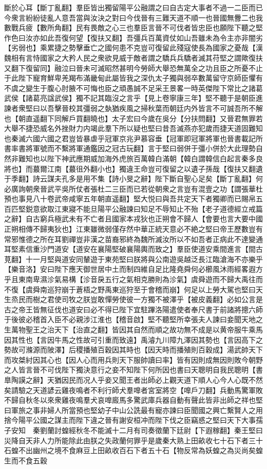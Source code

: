斷於心耳【斷丁亂翻】羣臣皆出獨留陽平公融謂之曰自古定大事者不過一二臣而已今衆言紛紛徒亂人意吾當與汝決之對曰今伐晉有三難天道不順一也晉國無釁二也我數戰兵疲【數所角翻】民有畏敵之心三也羣臣言晉不可伐者皆忠臣也願陛下聽之堅作色曰汝亦如此吾復何望【復扶又翻】吾彊兵百萬資仗如山吾雖未為令主亦非闇劣【劣弱也】乘累捷之勢擊垂亡之國何患不克豈可復留此殘寇使長為國家之憂哉【漢魏相有言恃國家之大矜人民之衆欲見威于敵者謂之驕兵兵驕者滅其苻堅之謂歟復扶又翻下復留同】融泣曰晉未可滅昭然甚明今勞師大舉恐無萬全之功且臣之所憂不止于此陛下寵育鮮卑羌羯布滿畿甸此屬皆我之深仇太子獨與弱卒數萬留守京師臣懼有不虞之變生于腹心肘腋不可悔也臣之頑愚誠不足采王景畧一時英傑陛下常比之諸葛武侯【諸葛亮諡武侯】獨不記其臨沒之言乎【見上卷寧康三年】堅不聽于是朝臣進諫者衆堅曰以吾擊晉校其彊弱之埶猶疾風之掃秋葉而朝廷内外皆言不可誠吾所不解也【朝直遥翻下同解戶買翻曉也】太子宏曰今歲在吳分【分扶問翻】又晉君無罪若大舉不捷恐威名外挫財力内竭此羣下所以疑也堅曰昔吾滅燕亦犯歲而捷天道固難知也秦滅六國六國之君豈皆暴虐乎冠軍京兆尹慕容垂【冠軍即冠軍將軍也晉書載記所書率書將軍號而不繫將軍通鑑因之冠古玩翻】言于堅曰弱併于彊小併於大此理勢自然非難知也以陛下神武應期威加海外虎旅百萬韓白滿朝【韓白謂韓信白起言秦多良將也】而蕞爾江南【蕞徂外翻小也】獨違王命豈可復留之以遺子孫哉【復扶又翻遺于季翻】詩云謀夫孔多是用不集【詩小旻之辭】陛下斷自聖心足矣【斷丁亂翻】何必廣詢朝衆晉武平吳所仗者張杜二三臣而已若從朝衆之言豈有混壹之功【謂張華杜預也事見八十卷武帝咸寧五年朝直遥翻】堅大悦曰與吾共定天下者獨卿而已賜帛五百匹堅鋭意欲取江東寢不能旦陽平公融諫曰知足不辱知止不殆【老子道德經立戒篇之辭】自古窮兵極武未有不亡者且國家本戎狄也正朔會不歸人【會要也言大要中國正朔相傳不歸夷狄也】江東雖微弱僅存然中華正統天意必不絶之堅曰帝王歷數豈有常邪惟德之所在耳劉禪豈非漢之苗裔邪終為魏所滅汝所以不如吾者正病此不達變通耳堅素信重沙門道安【道安在襄陽堅破襄陽輿而致之】羣臣使道安乘間進言【間古莧翻】十一月堅與道安同輦遊于東苑堅曰朕將與公南遊吳越泛長江臨滄海不亦樂乎【樂音洛】安曰陛下應天御世居中土而制四維自足比隆堯舜何必櫛風沐雨經畧遐方乎且東南卑濕沴氣易構【沴音戾五行之氣相克勝則為沴氣】虞舜遊而不歸大禹往而不復【虞舜南巡狩崩于蒼梧之野禹東巡狩至于會稽而崩】何足以上勞大駕也堅曰天生烝民而樹之君使司牧之朕豈敢憚勞使彼一方獨不被澤乎【被皮義翻】必如公言是古之帝王皆無征伐也道安曰必不得已陛下宜駐蹕洛陽遣使者奉尺書于前諸將摠六師于後彼必稽首入臣不必親涉江淮也【稽音啟】堅不聽堅所幸張夫人諫曰妾聞天地之生萬物聖王之治天下【治直之翻】皆因其自然而順之故功無不成是以黄帝服牛乘馬因其性也【言因牛馬之性故可引重而致遠】禹濬九川障九澤因其勢也【言因高下之勢故可滌源而陂澤】后稷播殖百穀因其時也【因天時而播殖則百穀成】湯武帥天下而攻桀紂因其心也【因人心而用兵則天下服帥讀曰率】皆有因則成無因則敗今朝野之人皆言晉不可伐陛下獨決意行之妾不知陛下何所因也書曰天聰明自我民聰明【書臯陶謨之辭】天猶因民而况人乎妾又聞王者出師必上觀天道下順人心今人心既不然矣請驗之天道諺云雞夜鳴者不利行師犬羣嘷者宮室將空【嘷戶刀翻】兵動馬驚軍敗不歸自秋冬以來衆雞夜鳴羣犬哀嘷廄馬多驚武庫兵器自動有聲此皆非出師之祥也堅曰軍旅之事非婦人所當預也堅幼子中山公詵最有寵亦諫曰臣聞國之興亡繫賢人之用捨今陽平公國之謀主而陛下違之晉有謝安桓冲而陛下伐之臣竊惑之堅曰天下大事孺子安知　秦劉蘭討蝗經秋冬不能滅十二月有司奏徵蘭下廷尉【下遐稼翻】秦王堅曰災降自天非人力所能除此由朕之失政蘭何罪乎是歲秦大熟上田畝收七十石下者三十石蝗不出幽州之境不食麻豆上田畝收百石下者五十石【物反常為妖蝗之為災尚矣蝗生而不食五穀